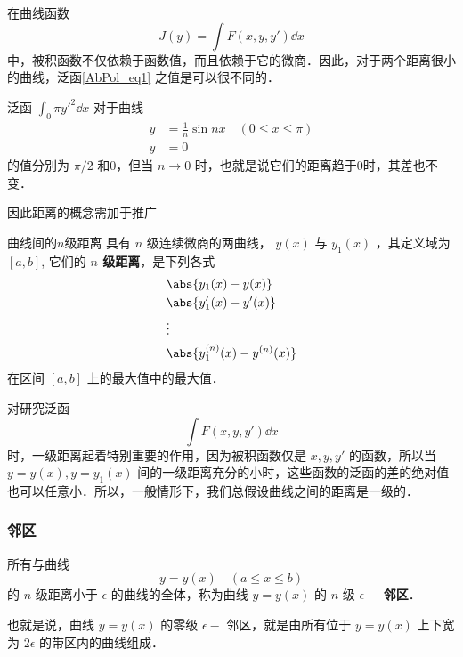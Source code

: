 在曲线函数
\begin{equation}\label{AbPol_eq1}
J(y)=\int F(x,y,y')\dd x
\end{equation}
中，被积函数不仅依赖于函数值，而且依赖于它的微商．因此，对于两个距离很小的曲线，泛函\autoref{AbPol_eq1} 之值是可以很不同的．
\begin{example}{}
泛函 $\int_0\pi y'^2\dd x$ 对于曲线
\begin{equation}
\begin{aligned}
y&=\frac{1}{n}\sin nx\quad (0\leq x\leq \pi)\\
y&=0
\end{aligned}
\end{equation}
的值分别为 $\pi/2$ 和0，但当 $n\rightarrow 0$ 时，也就是说它们的距离趋于0时，其差也不变．
\end{example}

因此距离的概念需加于推广
\begin{definition}{曲线间的$n$级距离}
具有 $n$ 级连续微商的两曲线， $y(x)$ 与 $y_1(x)$ ，其定义域为 $[a,b]$, 它们的 \textbf{$n$ 级距离}，是下列各式
\begin{equation}
\begin{aligned}
&\abs{y_1(x)-y(x)}\\
&\abs{y_1'(x)-y'(x)}\\
&\vdots\\
&\abs{y_1^{(n)}(x)-y^{(n)}(x)}\\
\end{aligned}
\end{equation}
在区间 $[a,b]$ 上的最大值中的最大值．
\end{definition}

对研究泛函
\begin{equation}
\int F(x,y,y')\dd x
\end{equation}
时，一级距离起着特别重要的作用，因为被积函数仅是 $x,y,y'$ 的函数，所以当 $y=y(x),y=y_1(x)$ 间的一级距离充分的小时，这些函数的泛函的差的绝对值也可以任意小．所以，一般情形下，我们总假设曲线之间的距离是一级的．
\subsubsection{邻区}
所有与曲线
\begin{equation}
y=y(x)\quad (a\leq x\leq b)
\end{equation}
 的 $n$ 级距离小于 $\epsilon$ 的曲线的全体，称为曲线 $y=y(x)$ 的 $n$ 级 $\epsilon -$ \textbf{邻区}． 
 
 也就是说，曲线 $y=y(x)$ 的零级 $\epsilon-$ 邻区，就是由所有位于 $y=y(x)$ 上下宽为 $2\epsilon$ 的带区内的曲线组成．